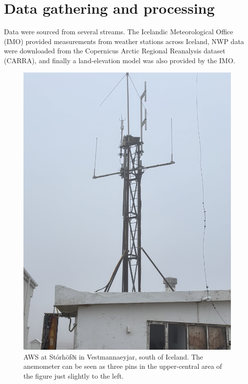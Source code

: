 
\chapter{Data gathering and processing}
\label{Chapter2}
Data were sourced from several streams. The Icelandic Meteorological Office (IMO) provided measurements from weather stations across Iceland, NWP data were downloaded from the Copernicus Arctic Regional Reanalysis dataset (CARRA), and finally a land-elevation model was also provided by the IMO.

\begin{figure}[H]
  \centering
  \includegraphics[scale=0.3]{Figures/storhofdi.jpeg}
  \caption[AWS at Stórhöfði in Vestmannaeyjar, south of Iceland.]{AWS at Stórhöfði in Vestmannaeyjar, south of Iceland. The anemometer can be seen as three pins in the upper-central area of the figure just slightly to the left.}
  \label{fig:storhofdi}
\end{figure}

